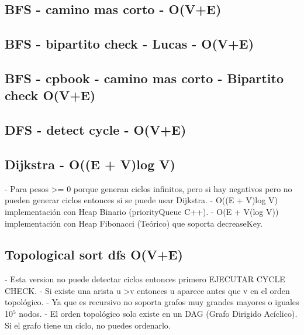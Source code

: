 \subsection{BFS - camino mas corto - O(V+E)}
\raggedbottom
\hrulefill
\subsection{BFS - bipartito check - Lucas - O(V+E)}
\raggedbottom
\hrulefill
\subsection{BFS - cpbook - camino mas corto - Bipartito check O(V+E)}
\raggedbottom
\hrulefill
\subsection{DFS - detect cycle - O(V+E)}
\raggedbottom
\hrulefill
\subsection{Dijkstra - O((E + V)log V)}
- Para pesos \textgreater= 0 porque generan ciclos infinitos, pero si hay negativos pero no pueden generar ciclos
entonces si se puede usar Dijkstra.
- O((E + V)log V) implementación con Heap Binario (priorityQueue C++).
- O(E + V(log V)) implementación con Heap Fibonacci (Teórico) que soporta decreaseKey.
\raggedbottom
\hrulefill
\subsection{Topological sort dfs O(V+E)}
- Esta version no puede detectar ciclos entonces primero EJECUTAR CYCLE CHECK.
- Si existe una arista u \textendash{}\textgreater v entonces u aparece antes que v en el orden topológico.
- Ya que es recursivo no soporta grafos muy grandes mayores o iguales 10$^5$ nodos.
- El orden topológico solo existe en un DAG (Grafo Dirigido Acíclico). Si el grafo tiene un ciclo, 
no puedes ordenarlo.
\raggedbottom
\hrulefill
